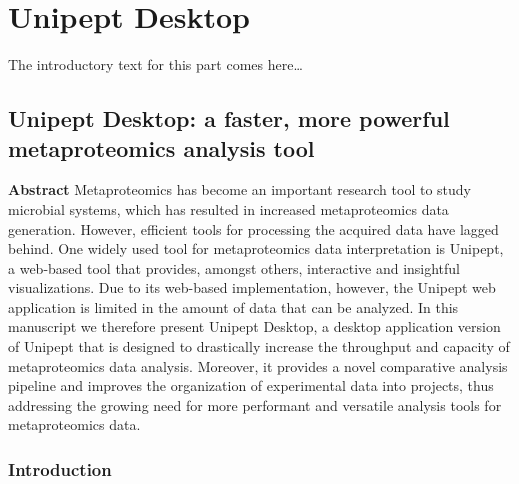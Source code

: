 \hypertarget{unipept-desktop}{%
\part{Unipept Desktop}\label{unipept-desktop}}

The introductory text for this part comes here\ldots{}

\hypertarget{unipept-desktop-a-faster-more-powerful-metaproteomics-analysis-tool}{%
\chapter{Unipept Desktop: a faster, more powerful metaproteomics
analysis
tool}\label{unipept-desktop-a-faster-more-powerful-metaproteomics-analysis-tool}}


\textbf{Abstract} Metaproteomics has become an important research tool
to study microbial systems, which has resulted in increased
metaproteomics data generation. However, efficient tools for processing
the acquired data have lagged behind. One widely used tool for
metaproteomics data interpretation is Unipept, a web-based tool that
provides, amongst others, interactive and insightful visualizations. Due
to its web-based implementation, however, the Unipept web application is
limited in the amount of data that can be analyzed. In this manuscript
we therefore present Unipept Desktop, a desktop application version of
Unipept that is designed to drastically increase the throughput and
capacity of metaproteomics data analysis. Moreover, it provides a novel
comparative analysis pipeline and improves the organization of
experimental data into projects, thus addressing the growing need for
more performant and versatile analysis tools for metaproteomics data.

\hypertarget{introduction-1}{%
\section{Introduction}\label{introduction-1}}

